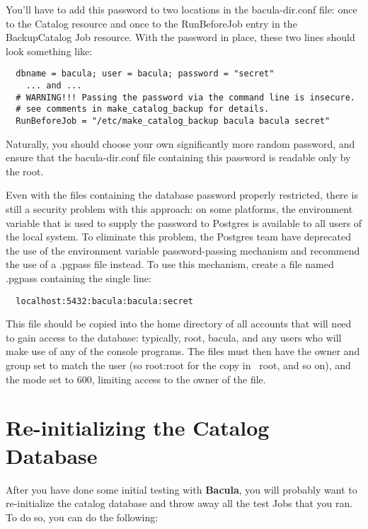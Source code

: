 You'll have to add this password to two locations in the
bacula-dir.conf file: once to the Catalog resource and once to the
RunBeforeJob entry in the BackupCatalog Job resource.  With the
password in place, these two lines should look something like:

\footnotesize
\begin{verbatim}
  dbname = bacula; user = bacula; password = "secret"
    ... and ...
  # WARNING!!! Passing the password via the command line is insecure.
  # see comments in make_catalog_backup for details.
  RunBeforeJob = "/etc/make_catalog_backup bacula bacula secret"
\end{verbatim}
\normalsize

Naturally, you should choose your own significantly more random
password, and ensure that the bacula-dir.conf file containing this
password is readable only by the root.

Even with the files containing the database password properly
restricted, there is still a security problem with this approach: on
some platforms, the environment variable that is used to supply the
password to Postgres is available to all users of the
local system.  To eliminate this problem, the Postgres team have
deprecated the use of the environment variable password-passing
mechanism and recommend the use of a .pgpass file instead.  To use
this mechanism, create a file named .pgpass containing the single
line:

\footnotesize
\begin{verbatim}
  localhost:5432:bacula:bacula:secret
\end{verbatim}
\normalsize

This file should be copied into the home directory of all accounts
that will need to gain access to the database: typically, root,
bacula, and any users who will make use of any of the console
programs.  The files must then have the owner and group set to match
the user (so root:root for the copy in ~root, and so on), and the mode
set to 600, limiting access to the owner of the file.

\section{Re-initializing the Catalog Database}

After you have done some initial testing with {\bf Bacula}, you will probably
want to re-initialize the catalog database and throw away all the test Jobs
that you ran. To do so, you can do the following: 

